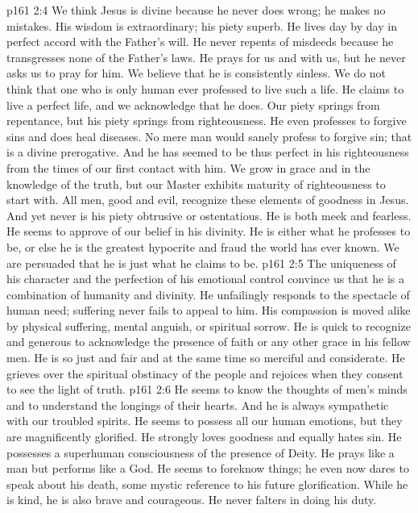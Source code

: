 \pc \vs p161 2:4 \bibnobreakspace We think Jesus is divine because he never does wrong; he makes no mistakes. His wisdom is extraordinary; his piety superb. He lives day by day in perfect accord with the Father’s will. He never repents of misdeeds because he transgresses none of the Father’s laws. He prays for us and with us, but he never asks us to pray for him. We believe that he is consistently sinless. We do not think that one who is only human ever professed to live such a life. He claims to live a perfect life, and we acknowledge that he does. Our piety springs from repentance, but his piety springs from righteousness. He even professes to forgive sins and does heal diseases. No mere man would sanely profess to forgive sin; that is a divine prerogative. And he has seemed to be thus perfect in his righteousness from the times of our first contact with him. We grow in grace and in the knowledge of the truth, but our Master exhibits maturity of righteousness to start with. All men, good and evil, recognize these elements of goodness in Jesus. And yet never is his piety obtrusive or ostentatious. He is both meek and fearless. He seems to approve of our belief in his divinity. He is either what he professes to be, or else he is the greatest hypocrite and fraud the world has ever known. We are persuaded that he is just what he claims to be.
\pc \vs p161 2:5 \bibnobreakspace The uniqueness of his character and the perfection of his emotional control convince us that he is a combination of humanity and divinity. He unfailingly responds to the spectacle of human need; suffering never fails to appeal to him. His compassion is moved alike by physical suffering, mental anguish, or spiritual sorrow. He is quick to recognize and generous to acknowledge the presence of faith or any other grace in his fellow men. He is so just and fair and at the same time so merciful and considerate. He grieves over the spiritual obstinacy of the people and rejoices when they consent to see the light of truth.
\pc \vs p161 2:6 \bibnobreakspace He seems to know the thoughts of men’s minds and to understand the longings of their hearts. And he is always sympathetic with our troubled spirits. He seems to possess all our human emotions, but they are magnificently glorified. He strongly loves goodness and equally hates sin. He possesses a superhuman consciousness of the presence of Deity. He prays like a man but performs like a God. He seems to foreknow things; he even now dares to speak about his death, some mystic reference to his future glorification. While he is kind, he is also brave and courageous. He never falters in doing his duty.\plusone
